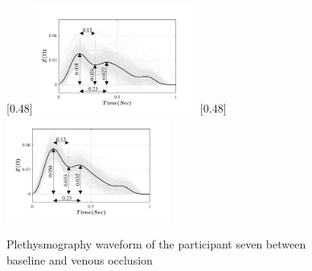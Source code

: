 \begin{figure}
	\centering
	\null\hfill%
	[0.48\textwidth]{\includegraphics[width=0.48\textwidth, trim={0.5cm 0cm 1.5cm 0 cm}, clip]{figure_apa_2a}}%
	\hfill%
	[0.48\textwidth]{\includegraphics[width=0.48\textwidth, trim={0.5cm 0cm 1.5cm 0 cm}, clip]{figure_apa_2b}}%
	\hfill\null%
	\caption{Plethysmography waveform of the participant seven between baseline and venous occlusion}
	\label{fig:iPG_venous}

	\vspace{1cm}


\end{figure}
